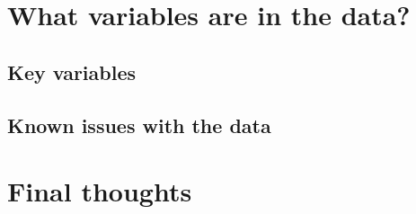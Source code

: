 \documentclass[
  12pt,
  openany]{book}
\begin{document}
\hypertarget{what-variables-are-in-the-data-5}{%
\section{What variables are in the data?}\label{what-variables-are-in-the-data-5}}

\hypertarget{key-variables-5}{%
\subsection{Key variables}\label{key-variables-5}}

\hypertarget{known-issues-with-the-data-5}{%
\subsection{Known issues with the data}\label{known-issues-with-the-data-5}}

\hypertarget{final-thoughts-5}{%
\section{Final thoughts}\label{final-thoughts-5}}

  
\end{document}
